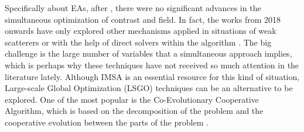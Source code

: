 		Specifically about EAs, after \citep{salucci2017multifrequency}, there were no significant advances in the simultaneous optimization of contrast and field. In fact, the works from 2018 onwards have only explored other mechanisms applied in situations of weak scatterers or with the help of direct solvers within the algorithm \citep{etminan2018electromagnetic,yang2021fft,yang2021hybrid}. The big challenge is the large number of variables that a simultaneous approach implies, which is perhaps why these techniques have not received so much attention in the literature lately. Although IMSA is an essential resource for this kind of situation, Large-scale Global Optimization (LSGO) techniques can be an alternative to be explored. One of the most popular is the Co-Evolutionary Cooperative Algorithm, which is based on the decomposition of the problem and the cooperative evolution between the parts of the problem \citep{ma2019survey}.
		
